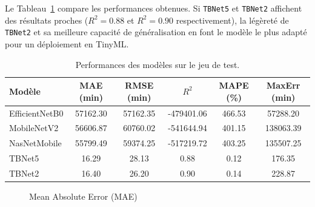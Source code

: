 Le Tableau~\ref{tab:metrics_comparison} compare les performances obtenues.
Si \texttt{TBNet5} et \texttt{TBNet2} affichent des résultats proches ($R^2 = 0.88$ et $R^2 = 0.90$ respectivement), la légèreté de \texttt{TBNet2} et sa meilleure capacité de généralisation en font le modèle le plus adapté pour un déploiement en TinyML.

\begin{table}[H]
	\centering
	\small
	\caption{Performances des modèles sur le jeu de test.}
	\label{tab:metrics_comparison}
	\begin{tabular}{|l|c|c|c|c|c|}
		\hline
		\textbf{Modèle}    & \textbf{MAE (min)} & \textbf{RMSE (min)} & \textbf{$R^2$} & \textbf{MAPE (\%)} & \textbf{MaxErr (min)} \\
		\hline
		EfficientNetB0 & 57162.30           & 57162.35            & -479401.06     & 466.53             & 57288.20              \\
		MobileNetV2        & 56606.87           & 60760.02            & -541644.94     & 401.15             & 138063.39             \\
		NasNetMobile   & 55799.49           & 59374.25            & -517219.72     & 403.25             & 135507.25             \\
		TBNet5             & 16.29              & 28.13               & 0.88           & 0.12               & 176.35                \\
		TBNet2             & 16.40              & 26.20               & 0.90           & 0.14               & 228.87                \\
		\hline
	\end{tabular}
\end{table}

\begin{figure}[H]
	\centering
	\caption{Mean Absolute Error (MAE)}
\end{figure}

